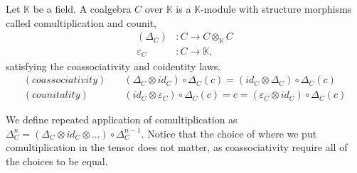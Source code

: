\documentclass[../thesis.tex]{subfiles}
\begin{document}
            \begin{definition}[Coalgebra]
                Let $\mathbb{K}$ be a field. A coalgebra $C$ over $\mathbb{K}$ is a $\mathbb{K}$-module with structure morphisms called comultiplication and counit,
                \begin{align*}
                    (\Delta_C) & : C \rightarrow C\otimes_{\mathbb{K}}C \\
                    \varepsilon_C & : C \rightarrow \mathbb{K},
                \end{align*}
                satisfying the coassociativity and coidentity laws. 
                \begin{align*}
                    (coassociativity)\quad & (\Delta_C\otimes id_C)\circ\Delta_C(c) = (id_C\otimes\Delta_C)\circ\Delta_C(c) \\
                    (counitality) \quad & (id_C\otimes\varepsilon_C)\circ\Delta_C(c) = c = (\varepsilon_C\otimes id_C)\circ\Delta_C(c)
                \end{align*}
            \end{definition}

            We define repeated application of comultiplication as $\Delta_C^n = (\Delta_C\otimes id_C\otimes ...)\circ\Delta_C^{n-1}$. Notice that the choice of where we put comultiplication in the tensor does not matter, as coassociativity require all of the choices to be equal.
            
\end{document}
